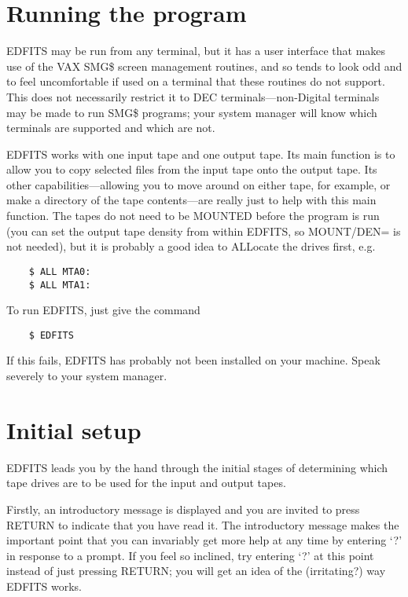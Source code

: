 \section{Running the program}

EDFITS may be run from any terminal, but it has a user interface that makes
use of the VAX SMG\$ screen management routines, and so tends to look odd
and to feel uncomfortable if used on a terminal that these routines do not
support.   This does not necessarily restrict it to DEC terminals---non-Digital
terminals may be made to run SMG\$ programs; your system manager will know
which terminals are supported and which are not.

EDFITS works with one input tape and one output tape.  Its main function is
to allow you to copy selected files from the input tape onto the output tape.
Its other capabilities---allowing you to move around on either tape, for
example, or make a directory of the tape contents---are really just to help
with this main function. The tapes do not need to be MOUNTED before the 
program is run (you can set the output tape density from within EDFITS, so
MOUNT/DEN= is not needed), but it is probably a good idea to ALLocate the 
drives first,
e.g.
\begin{verbatim}
    $ ALL MTA0:
    $ ALL MTA1:
\end{verbatim}

To run EDFITS, just give the command
\begin{verbatim}
    $ EDFITS
\end{verbatim}

If this fails, EDFITS has probably not been installed on your machine.  Speak
severely to your system manager.

\section{Initial setup}

EDFITS leads you by the hand through the initial stages of determining
which tape drives are to be used for the input and output tapes.  

Firstly, an introductory message is displayed and you are invited to press
RETURN to indicate that you have read it.  The introductory message makes the
important point that you can invariably get more help at any time by entering
`?' in response to a prompt.  If you feel so inclined, try entering `?'
at this point instead of just pressing RETURN; you will get an idea of the
(irritating?) way EDFITS works.

